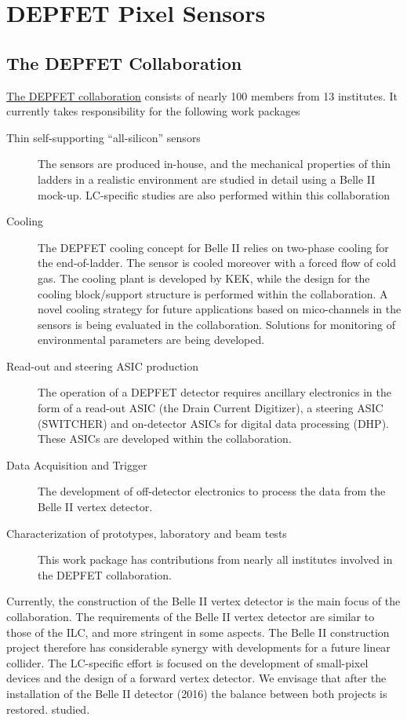 \section{DEPFET Pixel Sensors}

\subsection{The DEPFET Collaboration}
\href{http://www.hll.mpg.de/twiki/bin/view/DEPFET/CollaborationList}{The DEPFET collaboration} consists of nearly 100 members from 13 institutes. It currently takes responsibility for the following work packages
\begin{description}
\item[Thin self-supporting ``all-silicon'' sensors] {The sensors are produced in-house, and the mechanical properties of thin ladders in a realistic environment are studied in detail using a Belle II mock-up. LC-specific studies are also performed within this collaboration}
\item[Cooling] {The DEPFET cooling concept for Belle II relies on two-phase  cooling for the end-of-ladder. The sensor is cooled moreover with a forced flow of cold gas. The  cooling plant is developed by KEK, while the design for the cooling block/support structure is performed within the collaboration.
A novel cooling strategy for future applications based on mico-channels in the sensors is being evaluated in the collaboration. Solutions for monitoring of environmental parameters are being developed.}
\item[Read-out and steering ASIC production] {The operation of a DEPFET detector requires ancillary electronics in the form of a read-out ASIC (the Drain Current Digitizer), a steering ASIC (SWITCHER) and on-detector ASICs for digital data processing (DHP). These ASICs are developed within the collaboration.}
\item[Data Acquisition and Trigger] {The development of off-detector electronics to process the data from the Belle II vertex detector.}
\item[Characterization of prototypes, laboratory and beam tests] {This work package has contributions from nearly all institutes involved in the DEPFET collaboration.}
\end{description}

Currently, the construction of the Belle II vertex detector is the main focus of the collaboration. The requirements of the Belle II vertex detector are similar to those of the ILC, and more stringent in some aspects. The Belle II construction project therefore has considerable synergy with developments for a future linear collider. The LC-specific effort is focused on the development of small-pixel devices and the design of a forward vertex detector. We envisage that after the installation of the Belle II detector (2016) the balance between both projects is restored.
studied.

